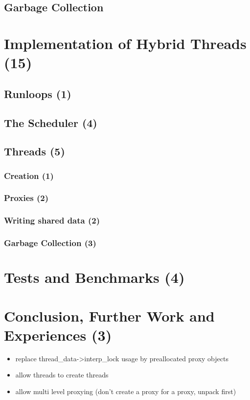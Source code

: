 \documentclass[bachelor,english]{hgbthesis}
\begin{document}
\section{Garbage Collection}

\chapter{Implementation of Hybrid Threads (15)}

\section{Runloops (1)}

\section{The Scheduler (4)}

\section{Threads (5)}

\subsection{Creation (1)}

\subsection{Proxies (2)}

\subsection{Writing shared data (2)}

\subsection{Garbage Collection (3)}

\chapter{Tests and Benchmarks (4)}

\chapter{Conclusion, Further Work and Experiences (3)}

\begin{itemize}
\item replace thread\_data->interp\_lock usage by preallocated proxy objects
\item allow threads to create threads
\item allow multi level proxying (don't create a proxy for a proxy, unpack first)
\end{itemize}



\end{document}
